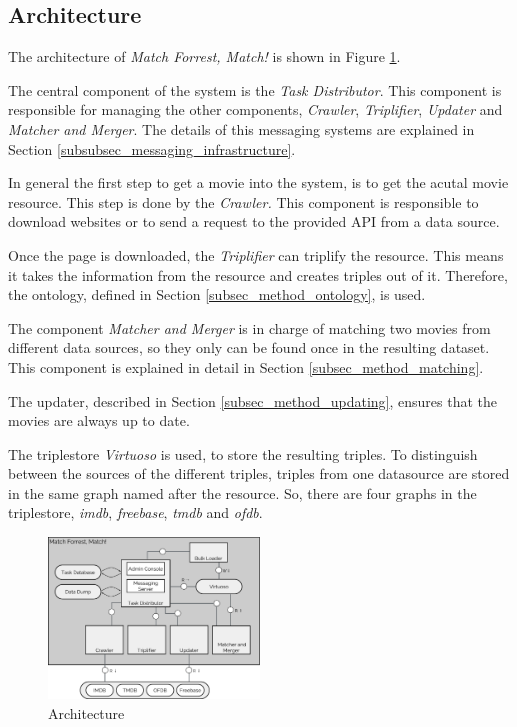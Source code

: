 \subsection{Architecture}
\label{subsec_method_architecture}

The architecture of \emph{Match Forrest, Match!} is shown in Figure \ref{fig_architecture}.

The central component of the system is the \textit{Task Distributor}.
This component is responsible for managing the other components, \textit{Crawler}, \textit{Triplifier}, \textit{Updater} and \textit{Matcher and Merger}.
The details of this messaging systems are explained in Section \ref{subsubsec_messaging_infrastructure}.

In general the first step to get a movie into the system, is to get the acutal movie resource.
This step is done by the \textit{Crawler.}
This component is responsible to download websites or to send a request to the provided API from a data source.

Once the page is downloaded, the \textit{Triplifier} can triplify the resource.
This means it takes the information from the resource and creates triples out of it.
Therefore, the ontology, defined in Section \ref{subsec_method_ontology}, is used.

The component \textit{Matcher and Merger} is in charge of matching two movies from different data sources, so they only can be found once in the resulting dataset.
This component is explained in detail in Section \ref{subsec_method_matching}.

The updater, described in Section \ref{subsec_method_updating}, ensures that the movies are always up to date.

The triplestore \textit{Virtuoso} is used, to store the resulting triples.
To distinguish between the sources of the different triples, triples from one datasource are stored in the same graph named after the resource.
So, there are four graphs in the triplestore, \textit{imdb}, \textit{freebase}, \textit{tmdb} and \textit{ofdb}.

\begin{figure}[ht]
  \begin{center}
  \includegraphics[width=0.5\textwidth]{images/architecture.pdf}
  \end{center}
  \caption{Architecture}
  \label{fig_architecture}
\end{figure}

